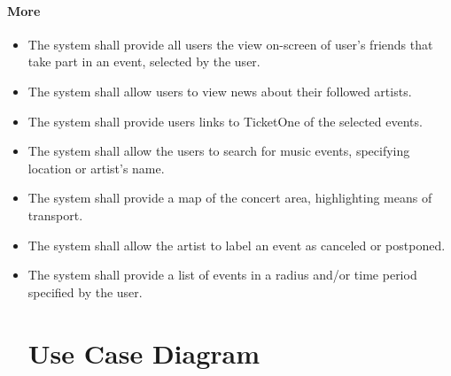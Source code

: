\documentclass[11pt,a4paper]{article}
\begin{document}
\paragraph{More}
\begin{itemize}
\item The system shall provide all users the view on-screen of user’s friends that take part in an event, selected by the user.
\item The system shall allow users to view news about their followed artists.
\item The system shall provide users links to TicketOne of the selected events.
\item The system shall allow the users to search for music events, specifying location or artist’s name.
\item The system shall provide a map of the concert area, highlighting means of transport.
\item The system shall allow the artist to label an event as canceled or postponed.
\item The system shall provide a list of events in a radius and/or time period specified by the user.
\section{Use Case Diagram}

\end{itemize}
\end{document}
